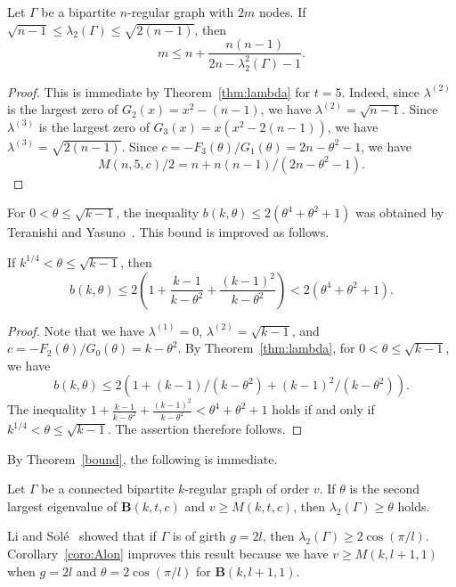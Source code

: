 \documentclass[ALCO,ThmDefs,Unicode,epreuves]{cedram}
\begin{document}
\begin{coro}[{\cite[Theorem~4]{HJ14}}] \label{coro:1}
Let $\Gamma$ be a bipartite $n$-regular graph with $2m$ nodes. 
If 
$
\sqrt{n-1} \leq \lambda_2(\Gamma)\leq \sqrt{2(n-1)}
$, 
then
\[
m \leq n+\frac{n(n-1)}{2n-\lambda_2^2(\Gamma)-1}. 
\]
\end{coro}
\begin{proof}
This is immediate by Theorem~\ref{thm:lambda} for $t=5$. Indeed, 
since $\lambda^{(2)}$ is the largest zero of $G_2(x)=x^2-(n-1)$, we have
$\lambda^{(2)}=\sqrt{n-1}$.
Since $\lambda^{(3)}$ is the largest zero of $G_3(x)=x(x^2-2(n-1))$, we have
$\lambda^{(3)}=\sqrt{2(n-1)}$. 
Since 
$
c=-F_{3}(\theta)/G_{1}(\theta)=2n-\theta^2-1
$, 
we have 
\[
M(n,5,c)/2=n+n(n-1)/(2n-\theta^2-1).
\]
\end{proof}

For $0<\theta \leq \sqrt{k-1}$, the inequality $b(k,\theta) \leq 2(\theta^4+\theta^2+1)$ was obtained by Teranishi and Yasuno~\cite[Proposition~7.1]{TY00}. This bound is improved as follows. 
\begin{coro} \label{coro:2}
If $k^{1/4} <\theta \leq \sqrt{k-1}$, then
\[
b(k,\theta) \leq 2\left(1+\frac{k-1}{k-\theta^2} + \frac{(k-1)^2}{k-\theta^2}\right) < 2(\theta^4+\theta^2+1). 
\]
\end{coro}
\begin{proof}
Note that we have $\lambda^{(1)}=0$, $\lambda^{(2)}=\sqrt{k-1}$, and $c=-F_2(\theta)/G_0(\theta)=k-\theta^2$. By Theorem~\ref{thm:lambda}, for $0< \theta \leq \sqrt{k-1}$, we have
\[
b(k,\theta) \leq 2(1+(k-1)/(k-\theta^2) + (k-1)^2/(k-\theta^2)).
\] 
The inequality $1+\frac{k-1}{k-\theta^2} + \frac{(k-1)^2}{k-\theta^2} < \theta^4+\theta^2+1$ holds if and only if $k^{1/4}< \theta \leq \sqrt{k-1}$. The assertion therefore follows. 
\end{proof}

By Theorem~\ref{bound}, the following is immediate.
\begin{coro} \label{coro:Alon}
Let $\Gamma$ be a connected bipartite $k$-regular graph of order $v$. If $\theta$ is the second largest eigenvalue of $\boldsymbol{B}(k,t,c)$ and $v\geq M(k,t,c)$, then $\lambda_2(\Gamma) \geq \theta$ holds.
\end{coro}
Li and Sol\'{e}~\cite[Theorems~3 and~5]{CLS96} showed that if $\Gamma$
is of girth $g=2l$, then $\lambda_2(\Gamma) \geq 2\cos (\pi/l)$.
Corollary~\ref{coro:Alon} improves this result because we have $v \geq
M(k,l+1,1)$ when $g=2l$ and $\theta=2\cos (\pi/l)$ for $\boldsymbol{B}(k,l+1,1)$.
\end{document}
